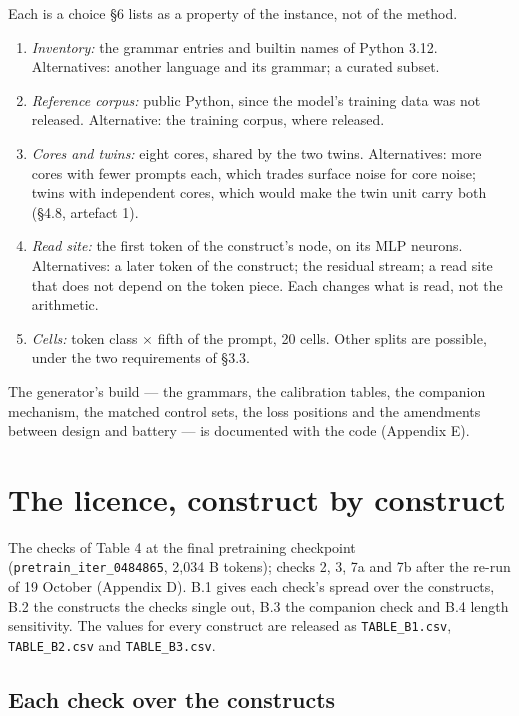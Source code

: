\documentclass{article}
\begin{document}
Each is a choice \S6 lists as a property of the instance, not of the method.
\begin{enumerate}[topsep=2pt,itemsep=1pt,parsep=0pt,partopsep=0pt,leftmargin=*]
\item \emph{Inventory:} the grammar entries and builtin names of Python 3.12. Alternatives: another language and its grammar; a curated subset.
\item \emph{Reference corpus:} public Python, since the model's training data was not released. Alternative: the training corpus, where released.
\item \emph{Cores and twins:} eight cores, shared by the two twins. Alternatives: more cores with fewer prompts each, which trades surface noise for core noise; twins with independent cores, which would make the twin unit carry both (\S4.8, artefact 1).
\item \emph{Read site:} the first token of the construct's node, on its MLP neurons. Alternatives: a later token of the construct; the residual stream; a read site that does not depend on the token piece. Each changes what is read, not the arithmetic.
\item \emph{Cells:} token class $\times$ fifth of the prompt, 20 cells. Other splits are possible, under the two requirements of \S3.3.
\end{enumerate}

The generator's build --- the grammars, the calibration tables, the companion mechanism, the matched control sets, the loss positions and the amendments between design and battery --- is documented with the code (Appendix E).


\section{The licence, construct by construct}

The checks of Table 4 at the final pretraining checkpoint (\texttt{pretrain\_iter\_0484865}, 2,034 B tokens); checks 2, 3, 7a and 7b after the re-run of 19 October (Appendix D). B.1 gives each check's spread over the constructs, B.2 the constructs the checks single out, B.3 the companion check and B.4 length sensitivity. The values for every construct are released as \texttt{TABLE\_B1.csv}, \texttt{TABLE\_B2.csv} and \texttt{TABLE\_B3.csv}.

\subsection{Each check over the constructs}
\end{document}
